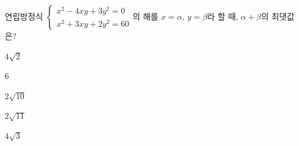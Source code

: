 연립방정식 $\begin{cases} x^2-4xy+3y^2=0 \\ x^2+3xy+2y^2=60 \end{cases}$의 해를 $x=\alpha$, $y=\beta$라 할 때, $\alpha+\beta$의 최댓값은?
\begin{choices32}{\rule[-3ex]{0pt}{8ex}$4\sqrt{2}$}{\rule[-3ex]{0pt}{8ex}$6$}{\rule[-3ex]{0pt}{8ex}$2\sqrt{10}$}{\rule[-3ex]{0pt}{8ex}$2\sqrt{11}$}{\rule[-3ex]{0pt}{8ex}$4\sqrt{3}$}\end{choices32}
